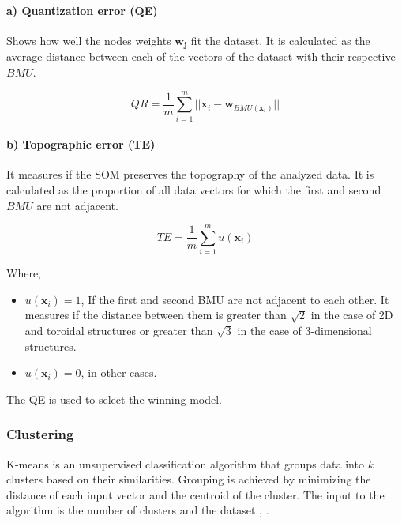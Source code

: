 \documentclass[conference]{IEEEtran}
\begin{document}
\paragraph*{a) Quantization error (QE)}
Shows how well the nodes weights $\boldsymbol{w_j}$ fit the dataset. It is calculated as the average distance between each of the vectors of the dataset with their respective $BMU$.

\begin{equation}
\label{eq11}
QR = \frac{1}{m} \sum_{i=1}^{m} || \boldsymbol{x}_i -  \boldsymbol{w}_{BMU(\boldsymbol{x}_i)}||
\end{equation}

\paragraph*{b) Topographic error (TE)}
It measures if the SOM preserves the topography of the analyzed data. It is calculated as the proportion of all data vectors for which the first and second $BMU$ are not adjacent. 

\begin{equation}
\label{eq12}
TE = \frac{1}{m} \sum_{i=1}^{m} u(\boldsymbol{x}_i)
\end{equation}

Where,

\begin{itemize}
	\item $u(\boldsymbol{x}_i) = 1$, If the first and second BMU are not adjacent to each other. It measures if the distance between them is greater than $\sqrt{2}$ in the case of 2D and toroidal structures or greater than $\sqrt{3}$ in the case of 3-dimensional structures.
	\item $u(\boldsymbol{x}_i) = 0$, in other cases.
\end{itemize}

The QE is used to select the winning model.

\subsubsection{Clustering}

K-means is an unsupervised classification algorithm that groups data into $k$ clusters based on their similarities. Grouping is achieved by minimizing the distance of each input vector and the centroid of the cluster. The input to the algorithm is the number of clusters and the dataset \cite{some_methods_macqueen}, \cite{k_means_arthur}.
\end{document}

